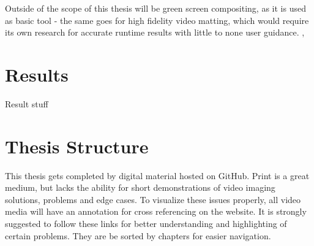 Outside of the scope of this thesis will be green screen compositing, as it is 
used as basic tool - the same goes for high fidelity video matting, which would 
require its own research for accurate runtime results with little to none user 
guidance. 
\cite{gong:realtime-matting:2010}, \cite{gastal:shared-sampling:2010}

\section{Results}
\label{sec:intro:results}

Result stuff

\section{Thesis Structure}
\label{sec:intro:structure}

This thesis gets completed by digital material hosted on GitHub. Print is a 
great medium, but lacks the ability for short demonstrations of video imaging 
solutions, problems and edge cases. To visualize these issues properly, all 
video media will have an annotation for cross referencing on the website. It is 
strongly suggested to follow these links for better understanding and 
highlighting of certain problems. They are be sorted by chapters for easier 
navigation.
